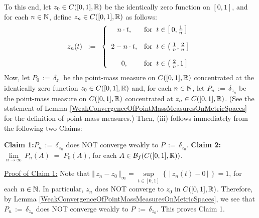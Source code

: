 \begin{enumerate}
	To this end, let $z_{0} \in C([0,1],\mathbb{R})$ be the identically zero function on $[0,1]$, and
	for each $n \in \mathbb{N}$, define $z_{n} \in C([0,1],\mathbb{R})$ as follows:
	\begin{equation*}
	z_{n}(t)
	\;\; := \;\;
	\left\{
	\begin{array}{cl}
	n\cdot t, & \textnormal{for}\;\; t \in \left[\,0,\frac{1}{n}\,\right] \\
	\\
	2 - n\cdot t, & \textnormal{for}\;\; t \in \left(\,\frac{1}{n},\frac{2}{n}\,\right] \\
	\\
	0, & \textnormal{for}\;\; t \in \left(\,\frac{2}{n},1\,\right] \\
	\end{array}
	\right.
	\end{equation*}
	Now, let $P_{0} \,:=\, \delta_{z_{0}}$ be the point-mass measure on $C([0,1],\mathbb{R})$ concentrated at
	the identically zero function $z_{0} \in C([0,1],\mathbb{R})$ and, for each $n \in \mathbb{N}$,
	let $P_{n} \,:=\, \delta_{z_{n}}$ be the point-mass measure on $C([0,1],\mathbb{R})$ concentrated at $z_{n} \in C([0,1],\mathbb{R})$.
	(See the statement of Lemma \ref{WeakConvergenceOfPointMassMeasuresOnMetricSpaces}
	for the definition of point-mass measures.)
	Then, (iii) follows immediately from the following two Claims:
		\begin{center}
		\begin{minipage}{6.0in}
		\vskip 0.5cm
		\textbf{Claim 1:}\quad $P_{n} \,:=\, \delta_{z_{n}}$ does NOT converge weakly to $P \,:=\, \delta_{z_{0}}$.
		\vskip 0.3cm
		\textbf{Claim 2:}\quad
		$\underset{n\rightarrow\infty}{\lim}\,P_{n}\!\left(A\right) \;=\; P_{0}\!\left(A\right)$,
		for each $A \in \mathcal{B}_{f}(C([0,1],\mathbb{R}))$.
		\end{minipage}
		\end{center}

	\vskip 0.5cm
	\noindent
	\underline{Proof of Claim 1:} \;
	Note that $\Vert\,z_{n} - z_{0}\,\Vert_{\infty} = \underset{t\in[0,1]}{\sup}\!\left\{\,\vert\,z_{n}(t) - 0\,\vert\,\right\} = 1$,
	for each $n \in \mathbb{N}$. In particular, $z_{n}$ does NOT converge to $z_{0}$ in $C([0,1],\mathbb{R})$.
	Therefore, by Lemma \ref{WeakConvergenceOfPointMassMeasuresOnMetricSpaces}, we see that
	$P_{n} \,:=\, \delta_{z_{n}}$ does NOT converge weakly to $P \,:=\, \delta_{z_{0}}$.
	This proves Claim 1.
	

\end{enumerate}
